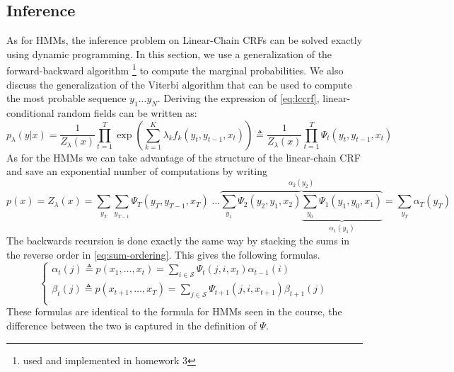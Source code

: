 \documentclass[a4paper, 11pt]{article}
\begin{document}
\subsection{Inference}

As for HMMs, the inference problem on Linear-Chain CRFs can be solved
exactly using dynamic programming. In this section, we use a
generalization of the forward-backward algorithm \footnote{used and
  implemented in homework 3} to compute the marginal probabilities. We
also discuss the generalization of the Viterbi algorithm that can be
used to compute the most probable sequence $y_1 \dots y_N$.
Deriving the expression of \eqref{eq:lccrf},
linear-conditional random fields can be written as:
\begin{equation}
  p_{\lambda}(y|x)
  = \dfrac{1}{Z_{\lambda}(x)} \prod\limits_{t=1}^T
  \exp\left(
    \sum\limits_{k=1}^K \lambda_k f_k(y_t, y_{t-1}, x_t)
  \right)
\triangleq \dfrac{1}{Z_{\lambda}(x)} \prod\limits_{t=1}^T \Psi_t(y_t, y_{t-1}, x_t)
\end{equation}
As for the HMMs we can take advantage of the structure of the
linear-chain CRF and save an exponential number of computations by
writing
\begin{equation}
  \label{eq:sum-ordering}
  p(x) = Z_{\lambda}(x) = \sum\limits_{y_T} \sum\limits_{y_{T-1}} \Psi_T(y_T, y_{T-1}, x_T)
                   \; \hdots \overbrace{\sum\limits_{y_{1}} \Psi_{2}(y_{2}, y_{1}, x_{2}) \underbrace{\sum\limits_{y_{0}} \Psi_{1}(y_{1}, y_{0}, x_{1})}_{\alpha_1(y_1)}}^{\alpha_2(y_2)} = \sum_{y_T} \alpha_T(y_T)
\end{equation}
The backwards recursion is done exactly the same way by stacking the
sums in the reverse order in \eqref{eq:sum-ordering}. This gives the
following formulas.
\begin{equation}
  \label{eq:reccurence}
  \left\{
    \begin{array}{l}
      \alpha_t(j) \triangleq p(x_1, \dots, x_t) = \sum_{i \in \mathcal{S}} \Psi_t(j, i, x_t) \alpha_{t - 1}(i) \\
      \beta_t(j) \triangleq p(x_{t+1}, \dots, x_T) = \sum_{j \in \mathcal{S}} \Psi_{t+1}(j, i, x_{t+1}) \beta_{t + 1}(j) \\
    \end{array}
  \right.
\end{equation}
These formulas are identical to the formula for HMMs seen in the
course, the difference between the two is captured in the definition
of $\Psi$.
\end{document}

